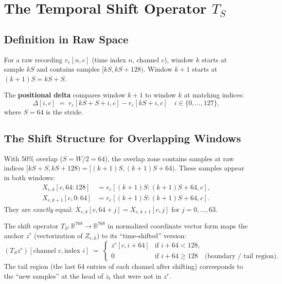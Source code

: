 \documentclass[11pt, a4paper]{article}
\theoremstyle{definition}
\theoremstyle{plain}
\newcommand{\R}{\mathbb{R}}
\begin{document}
\section{The Temporal Shift Operator $T_S$}

\subsection{Definition in Raw Space}

For a raw recording $r_e[n, c]$ (time index $n$, channel $c$), window $k$ starts at
sample $kS$ and contains samples $[kS, kS + 128)$. Window $k+1$ starts at $(k+1)S = kS + S$.

The \textbf{positional delta} compares window $k+1$ to window $k$ at matching indices:
\begin{equation}
  \Delta[i, c] \;=\; r_e[kS + S + i, c] - r_e[kS + i, c]
  \quad i \in \{0, \ldots, 127\},
\end{equation}
where $S = 64$ is the stride.

\subsection{The Shift Structure for Overlapping Windows}

With 50\% overlap ($S = W/2 = 64$), the overlap zone contains samples at raw indices
$[kS + S, kS + 128) = [(k+1)S, (k+1)S + 64)$. These samples appear in both windows:
\begin{align}
  X_{e,k}[c, 64:128] &= r_e[(k+1)S : (k+1)S + 64, c], \\
  X_{e,k+1}[c, 0:64] &= r_e[(k+1)S : (k+1)S + 64, c].
\end{align}
They are \emph{exactly} equal: $X_{e,k}[c, 64 + j] = X_{e,k+1}[c, j]$ for $j = 0, \ldots, 63$.

The shift operator $T_S: \R^{768} \to \R^{768}$ in normalized coordinate vector form
maps the anchor $z^r$ (vectorization of $Z_{e,k}$) to its ``time-shifted'' version:
\[
  (T_S z^r)[\text{channel } c, \text{index } i] \;=\;
  \begin{cases}
    z^r[c, i + 64] & \text{if } i + 64 < 128, \\
    0 & \text{if } i + 64 \ge 128 \quad \text{(boundary / tail region)}.
  \end{cases}
\]
The tail region (the last 64 entries of each channel after shifting) corresponds to
the ``new samples'' at the head of $z_t$ that were not in $z^r$.
\end{document}
